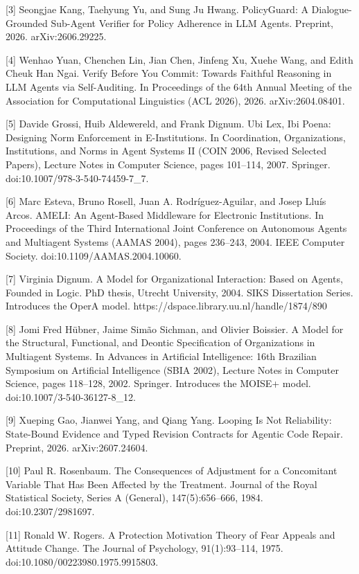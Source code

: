 \documentclass{article}
\begin{document}
[3] Seongjae Kang, Taehyung Yu, and Sung Ju Hwang. PolicyGuard: A Dialogue-Grounded Sub-Agent Verifier for Policy Adherence in LLM Agents. Preprint, 2026. arXiv:2606.29225.

[4] Wenhao Yuan, Chenchen Lin, Jian Chen, Jinfeng Xu, Xuehe Wang, and Edith Cheuk Han Ngai. Verify Before You Commit: Towards Faithful Reasoning in LLM Agents via Self-Auditing. In Proceedings of the 64th Annual Meeting of the Association for Computational Linguistics (ACL 2026), 2026. arXiv:2604.08401.

[5] Davide Grossi, Huib Aldewereld, and Frank Dignum. Ubi Lex, Ibi Poena: Designing Norm Enforcement in E-Institutions. In Coordination, Organizations, Institutions, and Norms in Agent Systems II (COIN 2006, Revised Selected Papers), Lecture Notes in Computer Science, pages 101--114, 2007. Springer. doi:10.1007/978-3-540-74459-7\_7.

[6] Marc Esteva, Bruno Rosell, Juan A. Rodr\'{i}guez-Aguilar, and Josep Llu\'{i}s Arcos. AMELI: An Agent-Based Middleware for Electronic Institutions. In Proceedings of the Third International Joint Conference on Autonomous Agents and Multiagent Systems (AAMAS 2004), pages 236--243, 2004. IEEE Computer Society. doi:10.1109/AAMAS.2004.10060.

[7] Virginia Dignum. A Model for Organizational Interaction: Based on Agents, Founded in Logic. PhD thesis, Utrecht University, 2004. SIKS Dissertation Series. Introduces the OperA model. https://dspace.library.uu.nl/handle/1874/890

[8] Jomi Fred H\"{u}bner, Jaime Sim\~{a}o Sichman, and Olivier Boissier. A Model for the Structural, Functional, and Deontic Specification of Organizations in Multiagent Systems. In Advances in Artificial Intelligence: 16th Brazilian Symposium on Artificial Intelligence (SBIA 2002), Lecture Notes in Computer Science, pages 118--128, 2002. Springer. Introduces the MOISE+ model. doi:10.1007/3-540-36127-8\_12.

[9] Xueping Gao, Jianwei Yang, and Qiang Yang. Looping Is Not Reliability: State-Bound Evidence and Typed Revision Contracts for Agentic Code Repair. Preprint, 2026. arXiv:2607.24604.

[10] Paul R. Rosenbaum. The Consequences of Adjustment for a Concomitant Variable That Has Been Affected by the Treatment. Journal of the Royal Statistical Society, Series A (General), 147(5):656--666, 1984. doi:10.2307/2981697.

[11] Ronald W. Rogers. A Protection Motivation Theory of Fear Appeals and Attitude Change. The Journal of Psychology, 91(1):93--114, 1975. doi:10.1080/00223980.1975.9915803.
\end{document}
